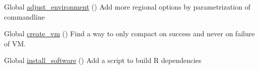 
\begin{DoxyRefList}
\item[Global \mbox{\hyperlink{group__mk_file_system_gaa8c398850ee5921a441408b92f32d477}{adjust\+\_\+environment}} ()]\label{todo__todo000002}%
%
Add more regional options by parametrization of commandline  
\item[Global \mbox{\hyperlink{group__create_installer_ga629c1830d8dbae377193387edd199399}{create\+\_\+vm}} ()]\label{todo__todo000001}%
%
Find a way to only compact on success and never on failure of VM.  
\item[Global \mbox{\hyperlink{group__mk_file_system_gab693423f511d21225dbc60b2782190c3}{install\+\_\+software}} ()]\label{todo__todo000003}%
%
Add a script to build R dependencies 
\end{DoxyRefList}